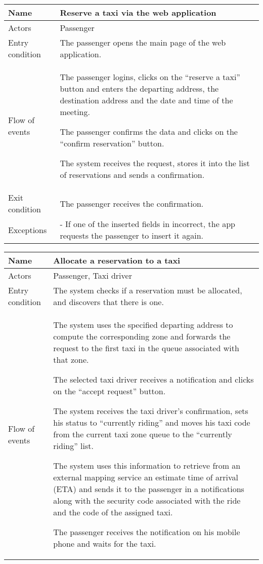 \begin{center}
\begin{longtable}{|l| p{9cm}|}
\hline
Name &
Reserve a taxi via the web application \\
\hline
Actors &
Passenger \\
\hline
Entry condition & 
The passenger opens the main page of the web application. \\
\hline
Flow of events & 
The passenger logins, clicks on the “reserve a taxi” button and enters the departing address, the destination address and the date and time of the meeting.

The passenger confirms the data and clicks on the “confirm reservation” button.

The system receives the request, stores it into the list of reservations and sends a confirmation. \\
\hline
Exit condition &
The passenger receives the confirmation. \\
\hline
Exceptions &
- If one of the inserted fields in incorrect, the app requests the passenger to insert it again. \\
\hline
\end{longtable}


\begin{longtable}{|l| p{9cm}|}
\hline
Name &
Allocate a reservation to a taxi \\
\hline
Actors &
Passenger, Taxi driver \\
\hline
Entry condition & 
The system checks if a reservation must be allocated, and discovers that there is one. \\
\hline
Flow of events & 
The system uses the specified departing address to compute the corresponding zone and forwards the request to the first taxi in the queue associated with that zone.

The selected taxi driver receives a notification
and clicks on the “accept request” button.

The system receives the taxi driver's confirmation, sets his status to “currently riding” and moves his taxi code from the current taxi zone queue to the “currently riding” list.

The system uses this information to retrieve from an external mapping service an estimate time of arrival (ETA) and sends it to the passenger in a notifications along with the security code associated with the ride and the code of the assigned taxi.

The passenger receives the notification on his mobile phone and waits for the taxi.


\end{longtable}
\end{center}
